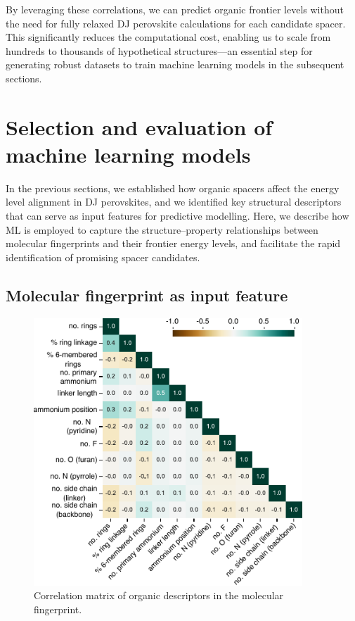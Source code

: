 By leveraging these correlations, we can predict organic frontier levels without the need for fully relaxed DJ perovskite calculations for each candidate spacer. This significantly reduces the computational cost, enabling us to scale from hundreds to thousands of hypothetical structures—an essential step for generating robust datasets to train machine learning models in the subsequent sections.

\section{Selection and evaluation of machine learning models}\label{section:section4-3}

In the previous sections, we established how organic spacers affect the energy level alignment in DJ perovskites, and we identified key structural descriptors that can serve as input features for predictive modelling. Here, we describe how ML is employed to capture the structure–property relationships between molecular fingerprints and their frontier energy levels, and facilitate the rapid identification of promising spacer candidates.

\subsection{Molecular fingerprint as input feature}

\begin{figure}[htbp]
    \centering
    \includegraphics[width=0.9\textwidth]{figures/HT-ML/figure4-10.pdf}
    \caption{Correlation matrix of organic descriptors in the molecular fingerprint.}
    \label{fig:figure4.10}
\end{figure}


